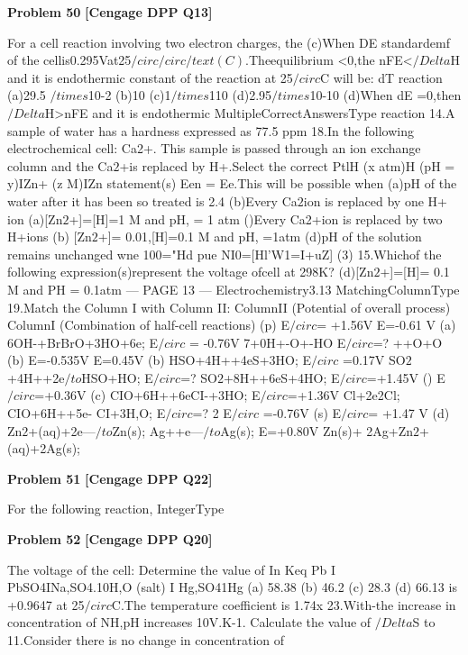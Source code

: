 \begin{problembox}
\textbf{Problem 50} \hfill \textbf{[Cengage DPP Q13]}
\label{q:ext-cng_dpp_all_questions-50}

For a cell reaction involving two electron charges, the
(c)When
DE
standardemf of the cellis0.295Vat25$/circ$$/circ/text(C)$.Theequilibrium
<0,the nFE<$/Delta$H and it is endothermic
constant of the reaction at 25$/circ$C will be:
dT
reaction
(a)29.5 $/times$10-2
(b)10 
(c)1$/times$110
(d)2.95$/times$10-10
(d)When
dE
=0,then $/Delta$H>nFE and it is endothermic
MultipleCorrectAnswersType
reaction
14.A sample of water has a hardness expressed as 77.5 ppm
18.In the following electrochemical cell:
Ca2+. This sample is passed through an ion exchange
column and the Ca$2$+is replaced by H+.Select the correct
PtlH (x atm)H (pH = y)IZn+ (z M)IZn
statement(s)
Een = Ee.This will be possible when
(a)pH of the water after it has been so treated is 2.4
(b)Every Ca$2$ion is replaced by one H+ ion
(a)[Zn$2$+]=[H]=1 M and pH, = 1 atm
()Every Ca2+ion is replaced by two H+ions
(b) [Zn$2$+]= 0.01,[H]=0.1 M and pH, =1atm
(d)pH of the solution remains unchanged
wne 100="Hd pue NI0=[Hl'W1=I+uZ] (3)
15.Whichof the following expression(s)represent the voltage
ofcell at 298K?
(d)[Zn$2$+]=[H]= 0.1 M and PH = 0.1atm
--- PAGE 13 ---
Electrochemistry3.13
MatchingColumnType
19.Match the Column I with Column II:
ColumnII
(Potential of overall process)
ColumnI
(Combination of half-cell reactions)
(p)
E$/circ$= +1.56V
E=-0.61 V
(a)
6OH-+BrBrO+3HO+6e;
E$/circ$ = -0.76V
7+0H+-O+-HO
E$/circ$=?
++O+O
(b)
E=-0.535V
E=0.45V
(b)
HSO+4H++4eS+3HO;
E$/circ$ =0.17V
SO$2$+4H++2e$/to$HSO+HO;
E$/circ$=?
SO$2$+8H++6eS+4HO; 
E$/circ$=+1.45V
()
E$/circ$=+0.36V
(c)
CIO+6H++6eCI-+3HO;
E$/circ$=+1.36V
Cl+2e2Cl;
CIO+6H++5e-
CI+3H,O;
E$/circ$=?
2
E$/circ$ =-0.76V
(s)
E$/circ$= +1.47 V
(d)
Zn$2$+(aq)+2e---$/to$Zn(s);
Ag++e---$/to$Ag(s);
E=+0.80V
Zn(s)+ 2Ag+Zn$2$+(aq)+2Ag(s);
\end{problembox}

\begin{problembox}
\textbf{Problem 51} \hfill \textbf{[Cengage DPP Q22]}
\label{q:ext-cng_dpp_all_questions-51}

For the following reaction,
IntegerType
\end{problembox}

\begin{problembox}
\textbf{Problem 52} \hfill \textbf{[Cengage DPP Q20]}
\label{q:ext-cng_dpp_all_questions-52}

The voltage of the cell:
Determine the value of In Keq
Pb I PbSO4INa,SO4.10H,O (salt) I Hg,SO41Hg
(a) 58.38
(b) 46.2
(c) 28.3
(d) 66.13
is +0.9647 at 25$/circ$C.The temperature coefficient is 1.74x
23.With-the increase in concentration of NH,pH increases
10V.K-1. Calculate the value of $/Delta$S
to 11.Consider there is no change in concentration of
\end{problembox}


